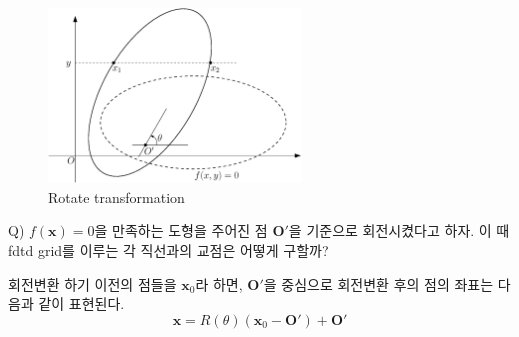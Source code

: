 \documentclass[a4paper]{article}
\begin{document}

\begin{figure}
	\centering
	\includegraphics[width=0.6\textwidth]{transformation-1} \caption{Rotate transformation} \label{fig:1}
\end{figure}

\begin{framed}
	Q) $f(\mathbf{x})=0$을 만족하는 도형을 주어진 점 $\mathbf{O}'$을 기준으로 회전시켰다고 하자. 이 때 fdtd grid를 이루는 각 직선과의 교점은 어떻게 구할까?
\end{framed}

회전변환 하기 이전의 점들을 $\mathbf{x}_0$라 하면, $\mathbf{O}'$을 중심으로 회전변환 후의 점의 좌표는 다음과 같이 표현된다.
\begin{equation}
	\mathbf{x} = R(\theta)(\mathbf{x}_0-\mathbf{O}') + \mathbf{O}' \label{eq:1}
\end{equation}

\end{document}
